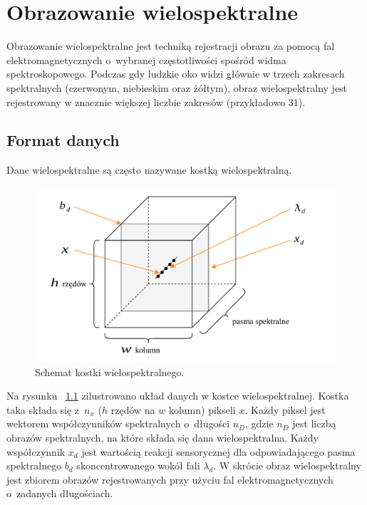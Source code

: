 
\chapter{Obrazowanie wielospektralne}
Obrazowanie wielospektralne jest techniką rejestracji obrazu za pomocą fal elektromagnetycznych o~wybranej częstotliwości spośród widma spektroskopowego. Podczas gdy ludzkie oko widzi głównie w trzech zakresach spektralnych (czerwonym, niebieskim oraz żółtym), obraz wielospektralny jest rejestrowany w znacznie większej liczbie zakresów (przykładowo 31).

\section{Format danych}
 Dane wielospektralne są często nazywane kostką wielospektralną. 

\begin{figure}[ht]
	\centering
		\includegraphics[width=0.75\linewidth]{rys02/multispectral-cube-vector}
	\caption{Schemat kostki wielospektralnego.}
	\label{fig:multispectral-cube}	
\end{figure}

Na rysunku ~\ref{fig:multispectral-cube} zilustrowano układ danych w kostce wielospektralnej. Kostka taka składa się z~$n_x$ ($h$ rzędów na $w$ kolumn) pikseli $x$. Każdy piksel jest wektorem współczynników spektralnych o~długości  $n_D$, gdzie $n_D$ jest liczbą obrazów spektralnych, na które składa się dana wielospektralna. Każdy współczynnik $x_d$ jest wartością reakcji sensorycznej dla odpowiadającego pasma spektralnego $b_d$ skoncentrowanego wokół fali $\lambda_d$. W skrócie obraz wielospektralny jest zbiorem obrazów rejestrowanych przy użyciu fal elektromagnetycznych o~zadanych długościach. 


